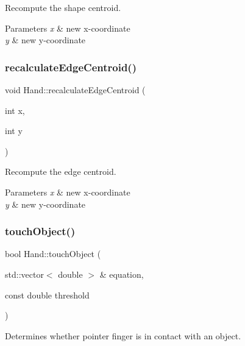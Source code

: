 Recompute the shape centroid. 


\begin{DoxyParams}{Parameters}
{\em x} & new x-\/coordinate \\
\hline
{\em y} & new y-\/coordinate \\
\hline
\end{DoxyParams}
\hypertarget{class_hand_a3af95101a355738577be20c734a46bf0}{}\label{class_hand_a3af95101a355738577be20c734a46bf0} 
\subsubsection{\texorpdfstring{recalculate\+Edge\+Centroid()}{recalculateEdgeCentroid()}}
{\footnotesize\ttfamily void Hand\+::recalculate\+Edge\+Centroid (\begin{DoxyParamCaption}\item[{int}]{x,  }\item[{int}]{y }\end{DoxyParamCaption})\hspace{0.3cm}{\ttfamily [protected]}}



Recompute the edge centroid. 


\begin{DoxyParams}{Parameters}
{\em x} & new x-\/coordinate \\
\hline
{\em y} & new y-\/coordinate \\
\hline
\end{DoxyParams}
\hypertarget{class_hand_aad89c3e47921cb0c39430f4501238088}{}\label{class_hand_aad89c3e47921cb0c39430f4501238088} 
\subsubsection{\texorpdfstring{touch\+Object()}{touchObject()}}
{\footnotesize\ttfamily bool Hand\+::touch\+Object (\begin{DoxyParamCaption}\item[{std\+::vector$<$ double $>$ \&}]{equation,  }\item[{const double}]{threshold }\end{DoxyParamCaption})}



Determines whether pointer finger is in contact with an object. 


